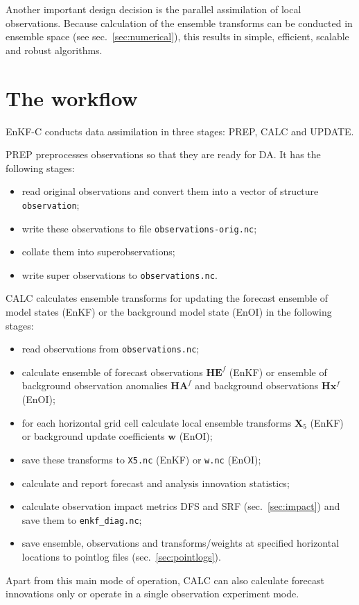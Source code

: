 \documentclass[11pt]{report}
\newcommand{\mb} {\mathbf}
\begin{document}
Another important design decision is the parallel assimilation of local observations.
Because calculation of the ensemble transforms can be conducted in ensemble space (see sec.~\ref{sec:numerical}), this results in simple, efficient, scalable and robust algorithms.

\section{The workflow}

EnKF-C conducts data assimilation in three stages: PREP, CALC and UPDATE.

PREP preprocesses observations so that they are ready for DA.
It has the following stages:
\begin{itemize}
\item read original observations and convert them into a vector of structure \verb|observation|;
\item write these observations to file \verb|observations-orig.nc|;
\item collate them into superobservations;
\item write super observations to \verb|observations.nc|.
\end{itemize}

CALC calculates ensemble transforms for updating the forecast ensemble of model states (EnKF) or the background model state (EnOI) in the following stages:
\begin{itemize}
\item read observations from \verb|observations.nc|;
\item calculate ensemble of forecast observations $\mb H \mb E^f$ (EnKF) or ensemble of background observation anomalies $\mb H \mb A^f$ and background observations $\mb H \mb x^f$ (EnOI);
\item for each horizontal grid cell calculate local ensemble transforms $\mb X_5$ (EnKF) or background update coefficients $\mb w$ (EnOI);
\item save these transforms to \verb|X5.nc| (EnKF) or \verb|w.nc| (EnOI);
\item calculate and report forecast and analysis innovation statistics;
\item calculate observation impact metrics DFS and SRF (sec.~\ref{sec:impact}) and save them to \verb|enkf_diag.nc|;
\item save ensemble, observations and transforms/weights at specified horizontal locations to pointlog files (sec.~\ref{sec:pointlogs}).
\end{itemize}
Apart from this main mode of operation, CALC can also calculate forecast  innovations only or operate in a single observation experiment mode.
\end{document}

